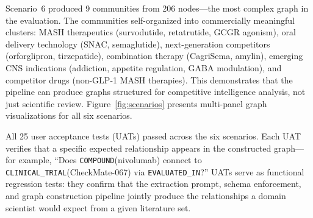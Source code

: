 Scenario~6 produced 9 communities from 206 nodes---the most complex graph in the evaluation. The communities self-organized into commercially meaningful clusters: MASH therapeutics (survodutide, retatrutide, GCGR agonism), oral delivery technology (SNAC, semaglutide), next-generation competitors (orforglipron, tirzepatide), combination therapy (CagriSema, amylin), emerging CNS indications (addiction, appetite regulation, GABA modulation), and competitor drugs (non-GLP-1 MASH therapies). This demonstrates that the pipeline can produce graphs structured for competitive intelligence analysis, not just scientific review.
Figure~\ref{fig:scenarios} presents multi-panel graph visualizations for all six scenarios.

All 25 user acceptance tests (UATs) passed across the six scenarios.
Each UAT verifies that a specific expected relationship appears in the constructed graph---for example, ``Does \texttt{COMPOUND}(nivolumab) connect to \texttt{CLINICAL\_TRIAL}(CheckMate-067) via \texttt{EVALUATED\_IN}?''
UATs serve as functional regression tests: they confirm that the extraction prompt, schema enforcement, and graph construction pipeline jointly produce the relationships a domain scientist would expect from a given literature set.
